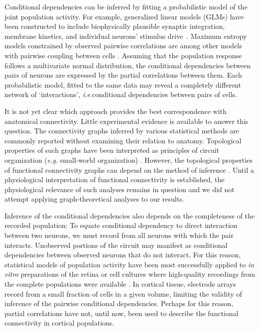 Conditional dependencies can be inferred by fitting a probabilistic model of the joint population activity. For example, generalized linear models (GLMs) have been constructed to  include biophysically plausible synaptic integration, membrane kinetics, and individual neurons' stimulus drive~\cite{Pillow:2008}.  Maximum entropy models constrained by observed pairwise correlations are among other models with pairwise coupling between cells \cite{Schneidman:2006, Tkacik:2006, Yu:2008, Tang:2008, Shlens:2009}.  Assuming that the population response follows a multivariate normal distribution, the conditional dependencies between pairs of neurons are expressed by the partial correlations between them.   Each probabilistic model, fitted to the same data may reveal a completely different network of `interactions',  \emph{i.e.}\;conditional dependencies between pairs of cells.

It is not yet clear which approach provides the best correspondence with anatomical connectivity. Little experimental evidence is available to answer this question.  The connectivity graphs inferred by various statistical methods are commonly reported without examining their relation to anatomy.
Topological properties of such graphs have been interpreted as principles of circuit organization (\emph{e.g.} small-world organization) \cite{Feldt:2011, Yu:2008, Malmersjo:2013, Sadovsky:2014}.  However, the topological properties of functional connectivity graphs can depend on the method of inference \cite{Zalesky:2012}. Until a physiological interpretation of functional connectivity is established, the physiological relevance of such analyses remains in question and we did not attempt applying graph-theoretical analyses to our results.

Inference of the conditional dependencies also depends on the completeness of the recorded population:  To equate conditional dependency to direct interaction between two neurons, we must record from all neurons with which the pair interacts. Unobserved portions of the circuit may manifest as conditional dependencies between observed neurons that do not interact. For this reason, statistical models of population activity have been most successfully applied to \emph{in vitro} preparations of the retina or cell cultures where high-quality recordings from the complete populations were available \cite{Pillow:2008}. In cortical tissue, electrode arrays record from a small fraction of cells in a given volume, limiting the validity of inference of the pairwise conditional dependencies. Perhaps for this reason, partial correlations have not, until now, been used to describe the functional connectivity in cortical populations.

